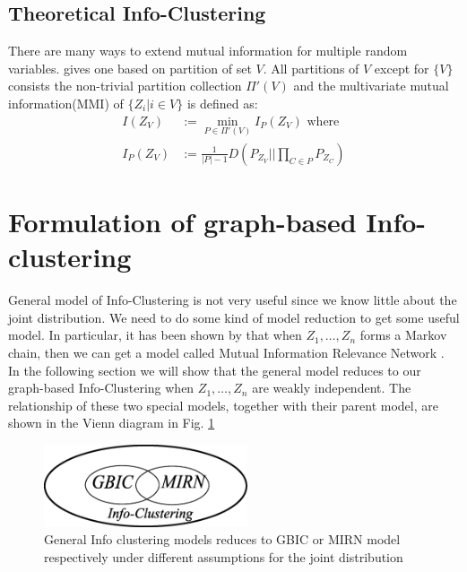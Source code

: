 \subsection{Theoretical Info-Clustering}
There are many ways to extend mutual information for multiple random variables. \cite{ic2016} gives one based on partition of set $V$. All partitions of $V$ except for $\{V\}$ consists the non-trivial partition collection $\Pi'(V)$ and the multivariate mutual information(MMI) of $\{Z_i | i \in V\}$ is defined as:
\begin{align}
I(Z_V) &:= \min_{P \in \Pi'(V)} I_{P}(Z_V) \textrm{ where} \\
I_P(Z_V) &:= \frac{1}{|P| - 1}D(P_{Z_V} || \prod_{C\in P} P_{Z_C})
\end{align}

\section{Formulation of graph-based Info-clustering}\label{sec:GBIC}

General model of Info-Clustering is not very useful since we know little about the joint distribution.
We need to do some kind of model reduction to get some useful model. In particular, it has been shown
by \cite{ic2016} that when $Z_1, \dots, Z_n$ forms a Markov chain, then we can get a model called Mutual Information Relevance Network \cite{butte1999mutual}. In the following section we will show
that the general model reduces to our graph-based Info-Clustering when $Z_1, \dots, Z_n$ are weakly
independent. The relationship of these two special models, together with their parent model, are shown
in the Vienn diagram in Fig. \ref{fig:relationship} %
\begin{figure}
\centering
  \includegraphics[width=6cm]{relationship.eps}
\caption{General Info clustering models reduces to GBIC or MIRN model respectively under different assumptions for the joint distribution}
\label{fig:relationship}       %
\end{figure}
%
%
